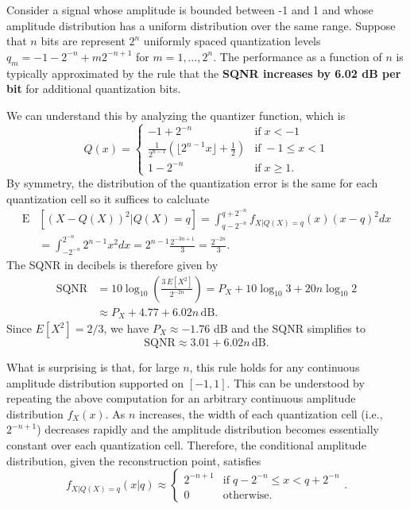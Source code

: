 \newpage

\begin{example}
Consider a signal whose amplitude is bounded between -1 and 1 and whose amplitude distribution has a uniform distribution over the same range.
Suppose that $n$ bits are represent $2^n$ uniformly spaced quantization levels $q_m = -1-2^{-n} + m 2^{-n+1}$ for $m=1,\ldots,2^n$.
The performance as a function of $n$ is typically approximated by the rule that the \textbf{SQNR increases by 6.02 dB per bit} for additional quantization bits.

We can understand this by analyzing the quantizer function, which is
\[ Q(x) =
\begin{cases}
-1 + 2^{-n} & \mathrm{if} \; x < -1 \\
\frac{1}{2^{n-1}} \left( \lfloor 2^{n-1} x \rfloor + \frac{1}{2} \right) & \mathrm{if} \; - 1 \leq x < 1 \\
1 - 2^{-n} & \mathrm{if} \; x \geq 1.
\end{cases}
\]
By symmetry, the distribution of the quantization error is the same for each quantization cell so it suffices to calcluate
\begin{align*}
\mathrm{E} & \left[ \left( X - Q(X) \right)^2 \big| Q(X)=q \right]
= \int_{q-2^{-n}}^{q+2^{-n}} f_{X|Q(X)=q} (x) (x-q)^2 dx \\
&= \int_{-2^{-n}}^{2^{-n}} 2^{n-1} x^2 dx
= 2^{n-1} \frac{2^{-3n+1}}{3}
= \frac{2^{-2n}}{3}.
\end{align*}
The SQNR in decibels is therefore given by
\begin{align*}
\text{SQNR} &= 10 \log_{10} \left( \frac{3\,E[X^2]}{2^{-2n}} \right)
= P_X + 10 \log_{10} 3 + 20n \log_{10} 2 \\
& \approx P_X + 4.77 + 6.02 n \, \text{dB}.
\end{align*}
Since $E[X^2] = 2/3$, we have $P_X \approx -1.76$ dB and the SQNR simplifies to
\[ \text{SQNR} \approx 3.01 + 6.02 n \, \text{dB}. \]
\end{example}

What is surprising is that, for large $n$, this rule holds for any continuous amplitude distribution supported on $[-1,1]$.
This can be understood by repeating the above computation for an arbitrary continuous amplitude distribution $f_X (x)$.
As $n$ increases, the width of each quantization cell (i.e., $2^{-n+1}$) decreases rapidly and the amplitude distribution becomes essentially constant over each quantization cell.
Therefore, the conditional amplitude distribution, given the reconstruction point, satisfies
\[ f_{X|Q(X)=q} (x|q) \approx \begin{cases} 2^{-n+1} & \mathrm{if}\; q-2^{-n} \leq x < q+2^{-n} \\ 0 & \mathrm{otherwise.} \end{cases}. \]

